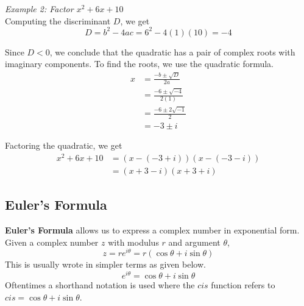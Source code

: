 \documentclass{article}
\begin{document}
            \noindent \textit{Example 2: Factor $x^2+6x+10$} \\
            Computing the discriminant $D$, we get \\

            \begin{equation*}
                D = b^2-4ac = 6^2-4(1)(10) = -4
            \end{equation*}

            \noindent Since $D<0$, we conclude that the quadratic has a pair of complex roots with
            imaginary components. To find the roots, we use the quadratic formula. \\

            \begin{align*}
                x &= \frac{-b\pm\sqrt{D}}{2a} \\
                &= \frac{-6\pm\sqrt{-4}}{2(1)} \\
                &= \frac{-6\pm 2\sqrt{-1}}{2} \\
                &= -3 \pm i
            \end{align*}

            \noindent Factoring the quadratic, we get \\

            \begin{align*}
                x^2+6x+10 &= (x-(-3+i))(x-(-3-i)) \\
                &= (x+3-i)(x+3+i)
            \end{align*}


        \subsection{Euler's Formula}
            \textbf{Euler's Formula} allows us to express a complex number in exponential form. \\
            \noindent Given a complex number $z$ with modulus $r$ and argument $\theta$, \\
            \begin{equation*}
                z=re^{i\theta}=r(\cos\theta+i\sin\theta)
            \end{equation*}
            \noindent This is usually wrote in simpler terms as given below. \\
            \begin{equation*}
                e^{i\theta}=\cos\theta+i\sin\theta
            \end{equation*}
            \noindent Oftentimes a shorthand notation is used where the $cis$ function refers to
            $cis=\cos\theta+i\sin\theta$.
\end{document}
